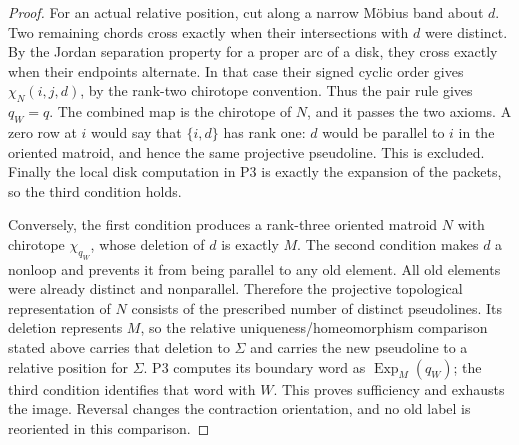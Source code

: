 \begin{proof}
For an actual relative position, cut along a narrow M\"obius band about
$d$.  Two remaining chords cross exactly when their intersections with
$d$ were distinct.  By the Jordan separation property for a proper arc
of a disk, they cross exactly when their endpoints alternate.  In that
case their signed cyclic order gives $\chi_N(i,j,d)$, by the
rank-two chirotope convention.  Thus the pair rule gives $q_W=q$.
The combined map is the chirotope of $N$, and it passes the two axioms.
A zero row at $i$ would say that $\{i,d\}$ has rank one: $d$ would be
parallel to $i$ in the oriented matroid, and hence the same projective
pseudoline.  This is excluded.  Finally the local disk computation in
P3 is exactly the expansion of the packets, so the third condition
holds.

Conversely, the first condition produces a rank-three oriented matroid
$N$ with chirotope $\chi_{q_W}$, whose deletion of $d$ is exactly $M$.
The second condition makes $d$ a nonloop and prevents it from being
parallel to any old element.  All old elements were already distinct
and nonparallel.  Therefore the projective topological representation
of $N$ consists of the prescribed number of distinct pseudolines.
Its deletion represents $M$, so the relative uniqueness/homeomorphism
comparison stated above carries that deletion to $\Sigma$ and carries
the new pseudoline to a relative position for $\Sigma$.  P3 computes
its boundary word as $\operatorname{Exp}_M(q_W)$; the third condition
identifies that word with $W$.  This proves sufficiency and exhausts
the image.  Reversal changes the contraction orientation, and no old
label is reoriented in this comparison.
\end{proof}

